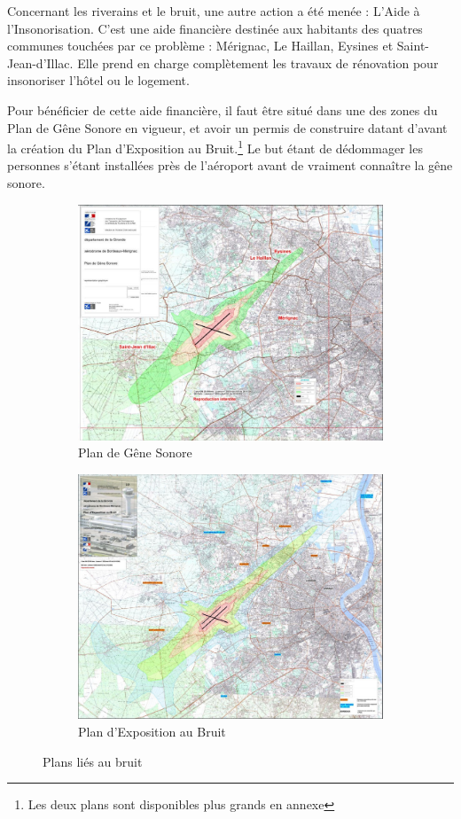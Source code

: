 Concernant les riverains et le bruit, une autre action a été menée : L'Aide à l'Insonorisation.
C'est une aide financière destinée aux habitants des quatres communes touchées par ce problème : Mérignac, Le Haillan, Eysines et Saint-Jean-d'Illac. Elle prend en charge complètement les travaux de rénovation pour insonoriser l'hôtel ou le logement.

Pour bénéficier de cette aide financière, il faut être situé dans une des zones du Plan de Gêne Sonore en vigueur, et avoir un permis de construire datant d'avant la création du Plan d'Exposition au Bruit.\footnote{Les deux plans sont disponibles plus grands en annexe}
Le but étant de dédommager les personnes s'étant installées près de l'aéroport avant de vraiment connaître la gêne sonore.

\begin{figure}[hbt!]
  \begin{subfigure}{0.45\textwidth}
    \centering
    \includegraphics[width=.7\linewidth]{Images/pgs.png}  
    \caption{Plan de Gêne Sonore}
    \label{fig:pgs}
  \end{subfigure}
  \begin{subfigure}{0.45\textwidth}
    \centering
    \includegraphics[width=.7\linewidth]{Images/peb}\newline
    \caption{Plan d'Exposition au Bruit}
    \label{fig:peb}
  \end{subfigure}
  \caption{Plans liés au bruit}
\label{fig:plans}
\end{figure}


